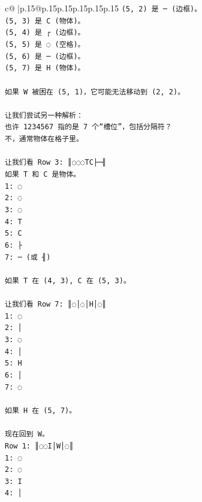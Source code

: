 \documentclass{article}
\begin{document}
{\begin{supertabular}{c@{$\;$}|p{.15\linewidth}@{}p{.15\linewidth}p{.15\linewidth}p{.15\linewidth}p{.15\linewidth}p{.15\linewidth}}
{{{\texttt{(5, 2) 是 ─ (边框)。} \\
\texttt{(5, 3) 是 C (物体)。} \\
\texttt{(5, 4) 是 ┌ (边框)。} \\
\texttt{(5, 5) 是 ◌ (空格)。} \\
\texttt{(5, 6) 是 ─ (边框)。} \\
\texttt{(5, 7) 是 H (物体)。} \\
\\ 
\texttt{如果 W 被困在 (5, 1)，它可能无法移动到 (2, 2)。} \\
\\ 
\texttt{让我们尝试另一种解析：} \\
\texttt{也许 1234567 指的是 7 个“槽位”，包括分隔符？} \\
\texttt{不，通常物体在格子里。} \\
\\ 
\texttt{让我们看 Row 3: ║◌◌◌TC├─╢} \\
\texttt{如果 T 和 C 是物体。} \\
\texttt{1: ◌} \\
\texttt{2: ◌} \\
\texttt{3: ◌} \\
\texttt{4: T} \\
\texttt{5: C} \\
\texttt{6: ├} \\
\texttt{7: ─ (或 ╢)} \\
\\ 
\texttt{如果 T 在 (4, 3), C 在 (5, 3)。} \\
\\ 
\texttt{让我们看 Row 7: ║◌│◌│H│◌║} \\
\texttt{1: ◌} \\
\texttt{2: │} \\
\texttt{3: ◌} \\
\texttt{4: │} \\
\texttt{5: H} \\
\texttt{6: │} \\
\texttt{7: ◌} \\
\\ 
\texttt{如果 H 在 (5, 7)。} \\
\\ 
\texttt{现在回到 W。} \\
\texttt{Row 1: ║◌◌I│W│◌║} \\
\texttt{1: ◌} \\
\texttt{2: ◌} \\
\texttt{3: I} \\
\texttt{4: │} \\
}}}
\end{supertabular}}
\end{document}
